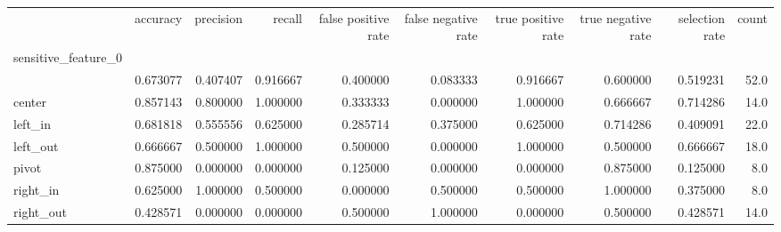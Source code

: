 \begin{tabular}{lrrrrrrrrr}
\toprule
{} &  accuracy &  precision &    recall &  false positive rate &  false negative rate &  true positive rate &  true negative rate &  selection rate &  count \\
sensitive\_feature\_0 &           &            &           &                      &                      &                     &                     &                 &        \\
\midrule
                    &  0.673077 &   0.407407 &  0.916667 &             0.400000 &             0.083333 &            0.916667 &            0.600000 &        0.519231 &   52.0 \\
center              &  0.857143 &   0.800000 &  1.000000 &             0.333333 &             0.000000 &            1.000000 &            0.666667 &        0.714286 &   14.0 \\
left\_in             &  0.681818 &   0.555556 &  0.625000 &             0.285714 &             0.375000 &            0.625000 &            0.714286 &        0.409091 &   22.0 \\
left\_out            &  0.666667 &   0.500000 &  1.000000 &             0.500000 &             0.000000 &            1.000000 &            0.500000 &        0.666667 &   18.0 \\
pivot               &  0.875000 &   0.000000 &  0.000000 &             0.125000 &             0.000000 &            0.000000 &            0.875000 &        0.125000 &    8.0 \\
right\_in            &  0.625000 &   1.000000 &  0.500000 &             0.000000 &             0.500000 &            0.500000 &            1.000000 &        0.375000 &    8.0 \\
right\_out           &  0.428571 &   0.000000 &  0.000000 &             0.500000 &             1.000000 &            0.000000 &            0.500000 &        0.428571 &   14.0 \\
\bottomrule
\end{tabular}
